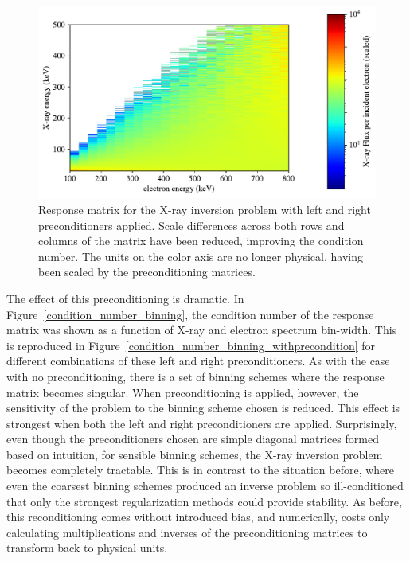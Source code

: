 \begin{figure}[p]
    \centering
    \includegraphics[width=\textwidth]{figures/chapter_4/matrix_scaling_plot/matrix_scaling_plot_xformed2.pdf}
    \caption{Response matrix for the X-ray inversion problem with left and right preconditioners applied. Scale differences across both rows and columns of the matrix have been reduced, improving the condition number. The units on the color axis are no longer physical, having been scaled by the preconditioning matrices.}
    \label{matrix_scaling_plot_transformed}
\end{figure}

The effect of this preconditioning is dramatic. In Figure~\ref{condition_number_binning}, the condition number of the response matrix was shown as a function of X-ray and electron spectrum bin-width. This is reproduced in Figure~\ref{condition_number_binning_withprecondition} for different combinations of these left and right preconditioners. As with the case with no preconditioning, there is a set of binning schemes where the response matrix becomes singular. When preconditioning is applied, however, the sensitivity of the problem to the binning scheme chosen is reduced. This effect is strongest when both the left and right preconditioners are applied. Surprisingly, even though the preconditioners chosen are simple diagonal matrices formed based on intuition, for sensible binning schemes, the X-ray inversion problem becomes completely tractable. This is in contrast to the situation before, where even the coarsest binning schemes produced an inverse problem so ill-conditioned that only the strongest regularization methods could provide stability. As before, this reconditioning comes without introduced bias, and numerically, costs only calculating multiplications and inverses of the preconditioning matrices to transform back to physical units. 

